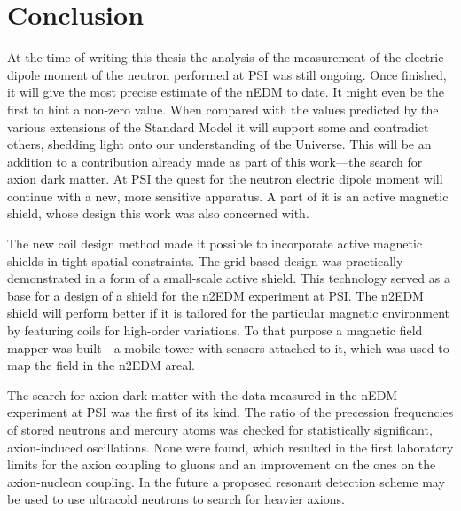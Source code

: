 
\begingroup

\let\clearpage\relax
\let\cleardoublepage\relax
\let\cleardoublepage\relax

\chapter*{Conclusion}
At the time of writing this thesis the analysis of the measurement of the electric dipole moment of the neutron performed at PSI was still ongoing. Once finished, it will give the most precise estimate of the nEDM to date. It might even be the first to hint a non-zero value. When compared with the values predicted by the various extensions of the Standard Model it will support some and contradict others, shedding light onto our understanding of the Universe. This will be an addition to a contribution already made as part of this work---the search for axion dark matter. At PSI the quest for the neutron electric dipole moment will continue with a new, more sensitive apparatus. A part of it is an active magnetic shield, whose design this work was also concerned with.

The new coil design method made it possible to incorporate active magnetic shields in tight spatial constraints. The grid-based design was practically demonstrated in a form of a small-scale active shield. This technology served as a base for a design of a shield for the n2EDM experiment at PSI\@. The n2EDM shield will perform better if it is tailored for the particular magnetic environment by featuring coils for high-order variations. To that purpose a magnetic field mapper was built---a mobile tower with sensors attached to it, which was used to map the field in the n2EDM areal.

The search for axion dark matter with the data measured in the nEDM experiment at PSI was the first of its kind. The ratio of the precession frequencies of stored neutrons and mercury atoms was checked for statistically significant, axion-induced oscillations. None were found, which resulted in the first laboratory limits for the axion coupling to gluons and an improvement on the ones on the axion-nucleon coupling. In the future a proposed resonant detection scheme may be used to use ultracold neutrons to search for heavier axions.

\endgroup